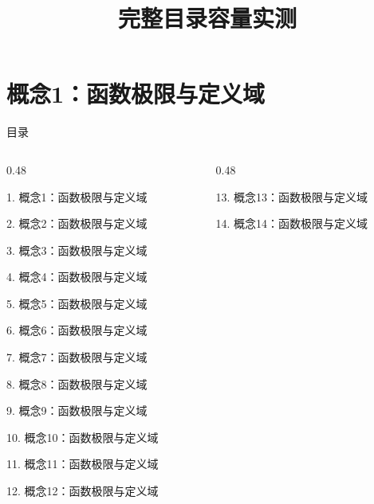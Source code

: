 \documentclass[aspectratio=169,10pt,fontset=fandol]{ctexbeamer}
\title{完整目录容量实测}
\begin{document}
\section{概念1：函数极限与定义域}
\begin{frame}[t,fragile]{目录}
\small
\begin{columns}[T,onlytextwidth]
\begin{column}{0.48\textwidth}
{\color{blue}\small 1. 概念1：函数极限与定义域\par}\vspace{0.22em}
{\color{gray!40}\small 2. 概念2：函数极限与定义域\par}\vspace{0.22em}
{\color{gray!40}\small 3. 概念3：函数极限与定义域\par}\vspace{0.22em}
{\color{gray!40}\small 4. 概念4：函数极限与定义域\par}\vspace{0.22em}
{\color{gray!40}\small 5. 概念5：函数极限与定义域\par}\vspace{0.22em}
{\color{gray!40}\small 6. 概念6：函数极限与定义域\par}\vspace{0.22em}
{\color{gray!40}\small 7. 概念7：函数极限与定义域\par}\vspace{0.22em}
{\color{gray!40}\small 8. 概念8：函数极限与定义域\par}\vspace{0.22em}
{\color{gray!40}\small 9. 概念9：函数极限与定义域\par}\vspace{0.22em}
{\color{gray!40}\small 10. 概念10：函数极限与定义域\par}\vspace{0.22em}
{\color{gray!40}\small 11. 概念11：函数极限与定义域\par}\vspace{0.22em}
{\color{gray!40}\small 12. 概念12：函数极限与定义域\par}\vspace{0.22em}
\end{column}
\begin{column}{0.48\textwidth}
{\color{gray!40}\small 13. 概念13：函数极限与定义域\par}\vspace{0.22em}
{\color{gray!40}\small 14. 概念14：函数极限与定义域\par}\vspace{0.22em}

\end{column}
\end{columns}
\end{frame}
\end{document}
